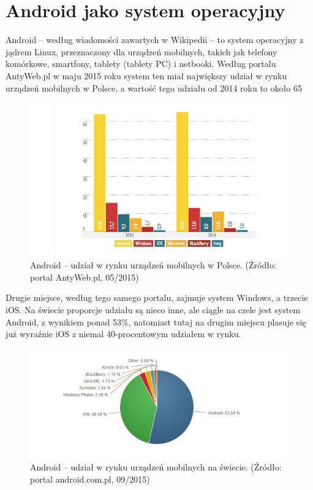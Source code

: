 \chapter{Android jako system operacyjny}

Android – według wiadomości zawartych w Wikipedii – to system operacyjny z jądrem Linux, przeznaczony dla urządzeń mobilnych, takich jak telefony komórkowe, smartfony, tablety (tablety PC) i netbooki. Według portalu AntyWeb.pl w maju 2015 roku system ten miał największy udział w rynku urządzeń mobilnych w Polsce, a wartość tego udziału od 2014 roku to około 65 %

\begin{figure}[!htb]
    \centering
    \includegraphics[width=15cm]{imgs/ch2_android_udzial_1.png}
    \caption
{Android – udział w rynku urządzeń mobilnych w Polsce. (Źródło: portal AntyWeb.pl, 05/2015)}
    \label{fig:android_udzial_polska}
\end{figure} 

Drugie miejsce, według tego samego portalu, zajmuje system Windows, a trzecie iOS. Na świecie proporcje udziału są nieco inne, ale ciągle na czele jest system Android, z wynikiem ponad 53\%, natomiast tutaj na drugim miejscu plasuje się już wyraźnie iOS z niemal 40-procentowym udziałem w rynku.

\begin{figure}[!htb]
    \centering
    \includegraphics[width=17cm]{imgs/ch2_android_udzial_2.png}
    \caption
{Android – udział w rynku urządzeń mobilnych na świecie. (Źródło: portal android.com.pl, 09/2015)}
    \label{fig:android_udzial_zagranica}
\end{figure} 

